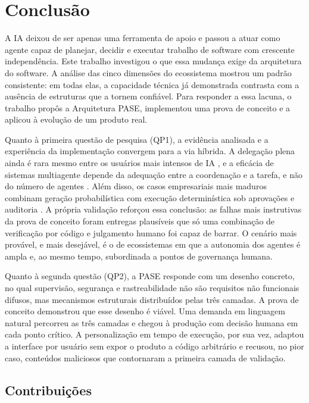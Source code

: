 
\chapter{Conclusão}\label{cap:6}

A IA deixou de ser apenas uma ferramenta de apoio e passou a atuar como agente capaz de planejar, decidir e executar trabalho de software com crescente independência. Este trabalho investigou o que essa mudança exige da arquitetura do software. A análise das cinco dimensões do ecossistema mostrou um padrão consistente: em todas elas, a capacidade técnica já demonstrada contrasta com a ausência de estruturas que a tornem confiável. Para responder a essa lacuna, o trabalho propôs a Arquitetura PASE, implementou uma prova de conceito e a aplicou à evolução de um produto real.

Quanto à primeira questão de pesquisa (QP1), a evidência analisada e a experiência da implementação convergem para a via híbrida. A delegação plena ainda é rara mesmo entre os usuários mais intensos de IA \cite{anthropic2026trends}, e a eficácia de sistemas multiagente depende da adequação entre a coordenação e a tarefa, e não do número de agentes \cite{kim2026scaling}. Além disso, os casos empresariais mais maduros combinam geração probabilística com execução determinística sob aprovações e auditoria \cite{vista2026outlook}. A própria validação reforçou essa conclusão: as falhas mais instrutivas da prova de conceito foram entregas plausíveis que só uma combinação de verificação por código e julgamento humano foi capaz de barrar. O cenário mais provável, e mais desejável, é o de ecossistemas em que a autonomia dos agentes é ampla e, ao mesmo tempo, subordinada a pontos de governança humana.

Quanto à segunda questão (QP2), a PASE responde com um desenho concreto, no qual supervisão, segurança e rastreabilidade não são requisitos não funcionais difusos, mas mecanismos estruturais distribuídos pelas três camadas. A prova de conceito demonstrou que esse desenho é viável. Uma demanda em linguagem natural percorreu as três camadas e chegou à produção com decisão humana em cada ponto crítico. A personalização em tempo de execução, por sua vez, adaptou a interface por usuário sem expor o produto a código arbitrário e recusou, no pior caso, conteúdos maliciosos que contornaram a primeira camada de validação.

\section{Contribuições}\label{sec:6.1}

